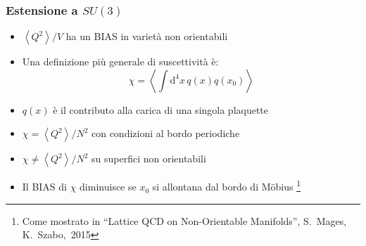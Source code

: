 \begin{frame}
    \begin{center}
    \end{center}
\end{frame}

\begin{frame}
    \frametitle{Estensione a $SU(3)$}
    \begin{itemize}
        \item $\left<Q^2\right>/V$ ha un BIAS in varietà non orientabili
        \item Una definizione più generale di suscettività è:
            $$\chi = \left<\int\mathrm d^4x\,q(x)q(x_0)\right>$$
        \item $q(x)$ è il contributo alla carica di una singola plaquette
        \item $\chi = \left<Q^2\right>/N^2$ con condizioni al bordo periodiche
        \item $\chi \neq \left<Q^2\right>/N^2$ su superfici non orientabili
        \item Il BIAS di $\chi$ diminuisce se $x_0$ si allontana dal bordo di M\"obius%
            \footnote{Come mostrato in ``Lattice QCD on Non-Orientable Manifolds'', %
            \mbox{S. Mages}, \mbox{K. Szabo, 2015}}
    \end{itemize}
\end{frame}

